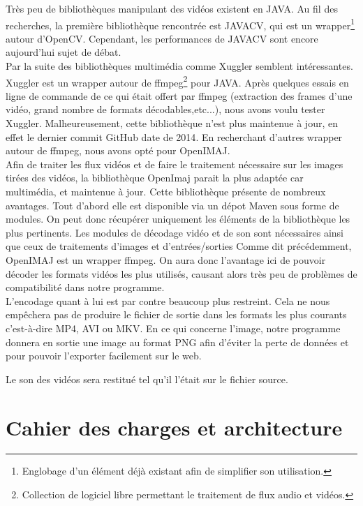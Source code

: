 \documentclass[10pt,a4paper]{article}
\begin{document}
Très peu de bibliothèques manipulant des vidéos existent en JAVA. Au fil des recherches, la première bibliothèque rencontrée est JAVACV\cite{javacv}, qui est un wrapper\footnote{Englobage d'un élément déjà existant
afin de simplifier son utilisation.} autour d'OpenCV. Cependant, les performances de JAVACV sont encore aujourd'hui sujet de débat.\\

Par la suite des bibliothèques multimédia comme Xuggler\cite{xuggler} semblent intéressantes. Xuggler est un wrapper autour de
ffmpeg\footnote{Collection de logiciel libre permettant le traitement de flux audio et vidéos.} pour JAVA. Après quelques essais en ligne de commande de ce qui était offert
par ffmpeg (extraction des frames d'une vidéo, grand nombre de formats décodables,etc...), nous avons voulu tester Xuggler. Malheureusement, cette bibliothèque n'est plus maintenue à jour, en effet le dernier
commit GitHub date de 2014\cite{xugglergit}. En recherchant d'autres wrapper autour de ffmpeg, nous avons opté pour OpenIMAJ\cite{openimaj}.\\

Afin de traiter les flux vidéos et de faire le traitement nécessaire sur les images tirées des vidéos, la bibliothèque OpenImaj parait la plus adaptée car multimédia, et maintenue à jour.
Cette bibliothèque présente de nombreux avantages. Tout d'abord elle est
disponible via un dépot Maven sous forme de modules\cite{openimajmvn}. On peut donc récupérer uniquement les éléments de la bibliothèque
les plus pertinents. Les modules de décodage vidéo et de son sont nécessaires ainsi que ceux de traitements d'images et d'entrées/sorties
Comme dit précédemment, OpenIMAJ est un wrapper ffmpeg. On aura donc l'avantage ici de pouvoir décoder les formats vidéos
les plus utilisés, causant alors très peu de problèmes de compatibilité dans notre
programme.\\

L'encodage quant à lui est par contre beaucoup plus restreint. Cela ne nous empêchera pas de produire
le fichier de sortie dans les formats les plus courants c'est-à-dire MP4, AVI ou MKV.
En ce qui concerne l'image, notre programme donnera en sortie une image au format PNG afin d'éviter la perte de données et
pour pouvoir l'exporter facilement sur le web.

Le son des vidéos sera restitué tel qu'il l'était sur le fichier source.

\section{Cahier des charges et architecture}
\end{document}
